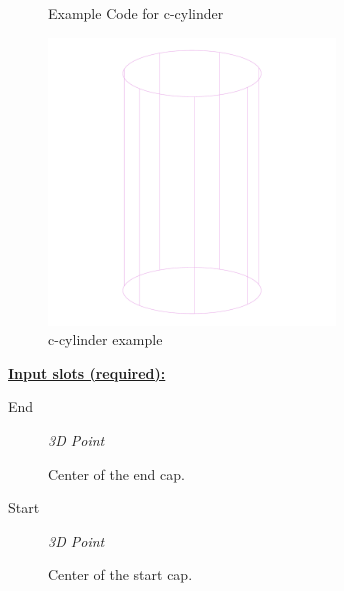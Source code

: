 \documentclass [11pt]{book}
\begin{document}
\begin{itemize}
\begin{figure}
\begin{lrbox}{\boxedverb}
\begin{minipage}{\linewidth}
{\begin{verbatim}
\end{verbatim}}
\end{minipage}
\end{lrbox}
\fbox{\usebox{\boxedverb}}

\caption{Example Code for c-cylinder}

\label{fig:example-code-c-cylinder}

\end{figure}

\begin{figure}
\begin{center}
\includegraphics[width=3in,height=3in]{../images/example-c-cylinder.pdf}
\end{center}

\caption{c-cylinder example}

\label{fig:c-cylinder}

\end{figure}





\textbf{
\underline{Input slots (required):}}

\begin{description}

\item [End]
\emph{3D Point}

 Center of the end cap.




\item [Start]
\emph{3D Point}

 Center of the start cap.




\end{description}







\end{itemize}
\end{document}
